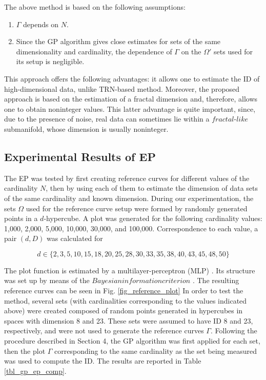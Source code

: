 \documentclass[journal]{IEEEtran}
\begin{document}
The above method is based on the following assumptions:
\begin{enumerate}[\IEEEsetlabelwidth{12)}]
  \item \(\Gamma\) depends on \(N\).
  \item Since the GP algorithm gives close estimates for sets of the 
  same dimensionality and cardinality, the dependence of \(\Gamma\) on the \(\Omega'\) sets used for its setup is negligible.
\end{enumerate}

This approach offers the following advantages: it allows one to estimate the ID of high-dimensional data, 
unlike TRN-based method. Moreover, the proposed approach is based on the estimation of a fractal dimension 
and, therefore, allows one to obtain noninteger values. This latter advantage is quite important, 
since, due to the presence of noise, real data can sometimes lie within a \(fractal\)-\(like\) submanifold, whose dimension is usually noninteger.

\subsection{Experimental Results of EP}
The EP was tested by first creating reference curves for different values of the cardinality \(N\), 
then by using each of them to estimate the dimension of data sets of the same cardinality and known dimension.
During our experimentation, the sets \(\Omega\) used for the reference curve setup were formed by randomly generated points in a \(d\)-hypercube. 
A plot was generated for the following cardinality values: 1,000, 2,000, 5,000, 10,000, 30,000, and 100,000. 
Correspondence to each value, a pair \((d, D)\) was calculated for

\begin{equation}
  \label{eq-ep-1}
  d \in \{2, 3, 5, 10, 15, 18, 20, 25, 28, 30, 33, 35, 38, 40, 43, 45, 48, 50\}
\end{equation}

The plot function is estimated by a multilayer-perceptron (MLP) \cite{Bishop95}. 
Its structure was set up by means of the \(Bayesian information criterion\) \cite{Schwartz78}.
The resulting reference curves can be seen in Fig. \ref{fig_reference_plot}
In order to test the method, several sets (with cardinalities corresponding to the values indicated above) were created 
composed of random points generated in hypercubes in spaces with dimension 8 and 23. These sets were assumed to have ID 8 and 23, 
respectively, and were not used to generate the reference curves \(\Gamma\).
Following the procedure described in Section 4, the GP algorithm was first applied for each set, then the plot  \(\Gamma\) 
corresponding to the same cardinality as the set being measured was used to compute the ID. The results are reported in Table \ref{tbl_gp_ep_comp}.
\end{document}
